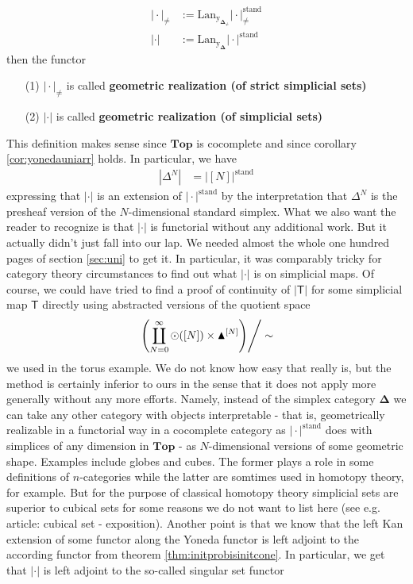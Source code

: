 \begin{align*}
  \vert
    \cdot
  \vert_{\neq}
  &:=
  \mathrm{Lan}_{\mathrm{y_{\mathbf{\Delta}_{\neq}}}}
  \vert
    \cdot
  \vert_{\neq}^{\textrm{stand}}
  \\
  \vert
    \cdot
  \vert
  &:=
  \mathrm{Lan}_{\mathrm{y_{\mathbf{\Delta}}}}
  \vert
    \cdot
  \vert^{\textrm{stand}}
\end{align*}
then the functor
\begin{enumerate}
\item[(1)]
$\vert \cdot \vert_{\neq}$ is called \textbf{geometric realization (of strict simplicial sets)}
\item[(2)]
$\vert \cdot \vert$ is called \textbf{geometric realization (of simplicial sets)}
\end{enumerate}
This definition makes sense since $\mathbf{Top}$ is cocomplete and since corollary \ref{cor:yonedauniarr} holds. In particular, we have
\begin{align*}
  \left\vert
    \Delta^{N}
  \right\vert
  &=
  \left\vert
    [N]
  \right\vert^{\textrm{stand}}
\end{align*}
expressing that $\vert \cdot \vert$ is an extension of $\vert \cdot \vert^{\textrm{stand}}$ by the interpretation that $\Delta^{N}$ is the presheaf version of the $N$-dimensional standard simplex. What we also want the reader to recognize is that $\vert \cdot \vert$ is functorial without any additional work. But it actually didn't just fall into our lap. We needed almost the whole one hundred pages of section \ref{sec:uni} to get it. In particular, it was comparably tricky for category theory circumstances to find out what $\vert \cdot \vert$ is on simplicial maps. Of course, we could have tried to find a proof of continuity of $\vert \mathsf{T} \vert$ for some simplicial map $\mathsf{T}$ directly using abstracted versions of the quotient space
\begin{align*}
  \left.
    \left(
      \coprod_{N=0}^{\infty}
      \odot([N])
      \times
      \blacktriangle^{[N]}
    \right)
  \right\slash
  \sim
\end{align*}
we used in the torus example. We do not know how easy that really is, but the method is certainly inferior to ours in the sense that it does not apply more generally without any more efforts. Namely, instead of the simplex category $\mathbf{\Delta}$ we can take any other category with objects interpretable - that is, geometrically realizable in a functorial way in a cocomplete category as $\vert \cdot \vert^{\textrm{stand}}$ does with simplices of any dimension in $\mathbf{Top}$ - as $N$-dimensional versions of some geometric shape. Examples include globes and cubes. The former plays a role in some definitions of $n$-categories while the latter are somtimes used in homotopy theory, for example. But for the purpose of classical homotopy theory simplicial sets are superior to cubical sets for some reasons we do not want to list here (see e.g. \cite{wiki-nlab0000} article: cubical set - exposition). Another point is that we know that the left Kan extension of some functor along the Yoneda functor is left adjoint to the according functor from theorem \ref{thm:initprobisinitcone}. In particular, we get that $\vert \cdot \vert$ is left adjoint to the so-called singular set functor
